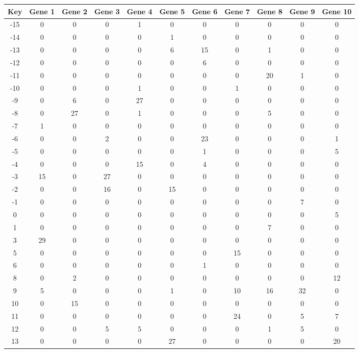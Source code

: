 \begin{tabular}{|c|c|c|c|c|c|c|c|c|c|c|}
\hline
Key & Gene 1 & Gene 2 & Gene 3 & Gene 4 & Gene 5 & Gene 6 & Gene 7 & Gene 8 & Gene 9 & Gene 10 \\
\hline
-15 & 0 & 0 & 0 & 1 & 0 & 0 & 0 & 0 & 0 & 0 \\
-14 & 0 & 0 & 0 & 0 & 1 & 0 & 0 & 0 & 0 & 0 \\
-13 & 0 & 0 & 0 & 0 & 6 & 15 & 0 & 1 & 0 & 0 \\
-12 & 0 & 0 & 0 & 0 & 0 & 6 & 0 & 0 & 0 & 0 \\
-11 & 0 & 0 & 0 & 0 & 0 & 0 & 0 & 20 & 1 & 0 \\
-10 & 0 & 0 & 0 & 1 & 0 & 0 & 1 & 0 & 0 & 0 \\
-9 & 0 & 6 & 0 & 27 & 0 & 0 & 0 & 0 & 0 & 0 \\
-8 & 0 & 27 & 0 & 1 & 0 & 0 & 0 & 5 & 0 & 0 \\
-7 & 1 & 0 & 0 & 0 & 0 & 0 & 0 & 0 & 0 & 0 \\
-6 & 0 & 0 & 2 & 0 & 0 & 23 & 0 & 0 & 0 & 1 \\
-5 & 0 & 0 & 0 & 0 & 0 & 1 & 0 & 0 & 0 & 5 \\
-4 & 0 & 0 & 0 & 15 & 0 & 4 & 0 & 0 & 0 & 0 \\
-3 & 15 & 0 & 27 & 0 & 0 & 0 & 0 & 0 & 0 & 0 \\
-2 & 0 & 0 & 16 & 0 & 15 & 0 & 0 & 0 & 0 & 0 \\
-1 & 0 & 0 & 0 & 0 & 0 & 0 & 0 & 0 & 7 & 0 \\
0 & 0 & 0 & 0 & 0 & 0 & 0 & 0 & 0 & 0 & 5 \\
1 & 0 & 0 & 0 & 0 & 0 & 0 & 0 & 7 & 0 & 0 \\
3 & 29 & 0 & 0 & 0 & 0 & 0 & 0 & 0 & 0 & 0 \\
5 & 0 & 0 & 0 & 0 & 0 & 0 & 15 & 0 & 0 & 0 \\
6 & 0 & 0 & 0 & 0 & 0 & 1 & 0 & 0 & 0 & 0 \\
8 & 0 & 2 & 0 & 0 & 0 & 0 & 0 & 0 & 0 & 12 \\
9 & 5 & 0 & 0 & 0 & 1 & 0 & 10 & 16 & 32 & 0 \\
10 & 0 & 15 & 0 & 0 & 0 & 0 & 0 & 0 & 0 & 0 \\
11 & 0 & 0 & 0 & 0 & 0 & 0 & 24 & 0 & 5 & 7 \\
12 & 0 & 0 & 5 & 5 & 0 & 0 & 0 & 1 & 5 & 0 \\
13 & 0 & 0 & 0 & 0 & 27 & 0 & 0 & 0 & 0 & 20 \\
\hline
\end{tabular}